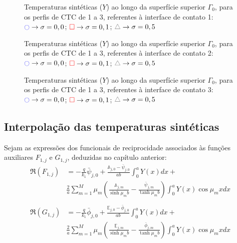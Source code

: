 \begin{figure}[H]
	\caption{Temperaturas sintéticas ($Y$) ao longo da superfície superior $\Gamma_0$, para os perfis de CTC de 1 a 3, referentes à interface de contato 1: $\textcolor{blue}{\ocircle} \rightarrow \sigma = 0,0$; $\textcolor{red}{\square} \rightarrow \sigma = 0,1$; $\textcolor{gray}{\triangle} \rightarrow \sigma = 0,5$}
	\label{figura_temperaturas_sinteticas_interface_01}
\end{figure}
\begin{figure}[H]
	\caption{Temperaturas sintéticas ($Y$) ao longo da superfície superior $\Gamma_0$, para os perfis de CTC de 1 a 3, referentes à interface de contato 2: $\textcolor{blue}{\ocircle} \rightarrow \sigma = 0,0$; $\textcolor{red}{\square} \rightarrow \sigma = 0,1$; $\textcolor{gray}{\triangle} \rightarrow \sigma = 0,5$}
	\label{figura_temperaturas_sinteticas_interface_02}
\end{figure}
\begin{figure}[H]
	\caption{Temperaturas sintéticas ($Y$) ao longo da superfície superior $\Gamma_0$, para os perfis de CTC de 1 a 3, referentes à interface de contato 3: $\textcolor{blue}{\ocircle} \rightarrow \sigma = 0,0$; $\textcolor{red}{\square} \rightarrow \sigma = 0,1$; $\textcolor{gray}{\triangle} \rightarrow \sigma = 0,5$}
	\label{figura_temperaturas_sinteticas_interface_03}
\end{figure}

\subsection{Interpolação das temperaturas sintéticas}
Sejam as expressões dos funcionais de reciprocidade associados às funções auxiliares $F_{1, j}$ e $G_{1, j}$, deduzidas no capítulo anterior:
\begin{align}
\Re(F_{1,j})
& =
-\frac{q}{k_1}\bar{\psi}_{j,0} + \frac{\mathbb{A}_{j,0} - \bar{\psi}_{j,0}}{ab}\int_0^a Y(x)dx + \nonumber \\
& \frac{2}{a}\sum_{m=1}^M \mu_m \left(\frac{\mathbb{A}_{j,m}}{\sinh\mu_m b} - \frac{\bar{\psi}_{j, m}}{\tanh\mu_m b}\right)\int_0^a Y(x)\cos\mu_m x dx
\label{calculo_FR_F1_antes_a} \\ \nonumber \\
\Re(G_{1,j})
& =
-\frac{q}{k_1}\bar{\phi}_{j,0} + \frac{\mathbb{E}_{j,0} - \bar{\phi}_{j,0}}{ab}\int_0^a Y(x)dx + \nonumber \\
& \frac{2}{a}\sum_{m=1}^M \mu_m \left(\frac{\mathbb{E}_{j,m}}{\sinh\mu_m b} - \frac{\bar{\phi}_{j, m}}{\tanh\mu_m b}\right)\int_0^a Y(x)\cos\mu_m x dx
\label{calculo_FR_G1_antes_a}
\end{align}


